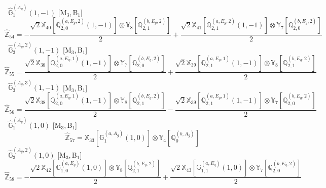 \documentclass[fleqn,10pt,landscape]{article}
\begin{document}
\begin{itemize}
\begin{dmath*}
\end{dmath*}
\vspace{4mm}
\noindent {} $\,\,\,\hat{\mathbb{G}}_{1}^{(A_{g})}(1,-1)$ [M$_{3}$,\,B$_{1}$]
\begin{dmath*}
\hat{\mathbb{Z}}_{54}=- \frac{\sqrt{2} \mathbb{X}_{40}[\mathbb{Q}_{2,0}^{(a,E_{g},2)}(1,-1)] \otimes\mathbb{Y}_{8}[\mathbb{Q}_{2,1}^{(b,E_{g},2)}]}{2} + \frac{\sqrt{2} \mathbb{X}_{41}[\mathbb{Q}_{2,1}^{(a,E_{g},2)}(1,-1)] \otimes\mathbb{Y}_{7}[\mathbb{Q}_{2,0}^{(b,E_{g},2)}]}{2}
\end{dmath*}
\vspace{4mm}
\noindent {} $\,\,\,\hat{\mathbb{G}}_{3}^{(A_{g},2)}(1,-1)$ [M$_{3}$,\,B$_{1}$]
\begin{dmath*}
\hat{\mathbb{Z}}_{55}=\frac{\sqrt{2} \mathbb{X}_{38}[\mathbb{Q}_{2,0}^{(a,E_{g},1)}(1,-1)] \otimes\mathbb{Y}_{7}[\mathbb{Q}_{2,0}^{(b,E_{g},2)}]}{2} + \frac{\sqrt{2} \mathbb{X}_{39}[\mathbb{Q}_{2,1}^{(a,E_{g},1)}(1,-1)] \otimes\mathbb{Y}_{8}[\mathbb{Q}_{2,1}^{(b,E_{g},2)}]}{2}
\end{dmath*}
\vspace{4mm}
\noindent {} $\,\,\,\hat{\mathbb{G}}_{3}^{(A_{g},3)}(1,-1)$ [M$_{3}$,\,B$_{1}$]
\begin{dmath*}
\hat{\mathbb{Z}}_{56}=\frac{\sqrt{2} \mathbb{X}_{38}[\mathbb{Q}_{2,0}^{(a,E_{g},1)}(1,-1)] \otimes\mathbb{Y}_{8}[\mathbb{Q}_{2,1}^{(b,E_{g},2)}]}{2} - \frac{\sqrt{2} \mathbb{X}_{39}[\mathbb{Q}_{2,1}^{(a,E_{g},1)}(1,-1)] \otimes\mathbb{Y}_{7}[\mathbb{Q}_{2,0}^{(b,E_{g},2)}]}{2}
\end{dmath*}
\vspace{4mm}
\noindent {} $\,\,\,\hat{\mathbb{G}}_{1}^{(A_{g})}(1,0)$ [M$_{3}$,\,B$_{1}$]
\begin{dmath*}
\hat{\mathbb{Z}}_{57}=\mathbb{X}_{33}[\mathbb{G}_{1}^{(a,A_{g})}(1,0)] \otimes\mathbb{Y}_{4}[\mathbb{Q}_{0}^{(b,A_{g})}]
\end{dmath*}
\vspace{4mm}
\noindent {} $\,\,\,\hat{\mathbb{G}}_{3}^{(A_{g},2)}(1,0)$ [M$_{3}$,\,B$_{1}$]
\begin{dmath*}
\hat{\mathbb{Z}}_{58}=- \frac{\sqrt{2} \mathbb{X}_{42}[\mathbb{G}_{1,0}^{(a,E_{g})}(1,0)] \otimes\mathbb{Y}_{8}[\mathbb{Q}_{2,1}^{(b,E_{g},2)}]}{2} + \frac{\sqrt{2} \mathbb{X}_{43}[\mathbb{G}_{1,1}^{(a,E_{g})}(1,0)] \otimes\mathbb{Y}_{7}[\mathbb{Q}_{2,0}^{(b,E_{g},2)}]}{2}
\end{dmath*}
\vspace{4mm}

\end{itemize}
\end{document}
